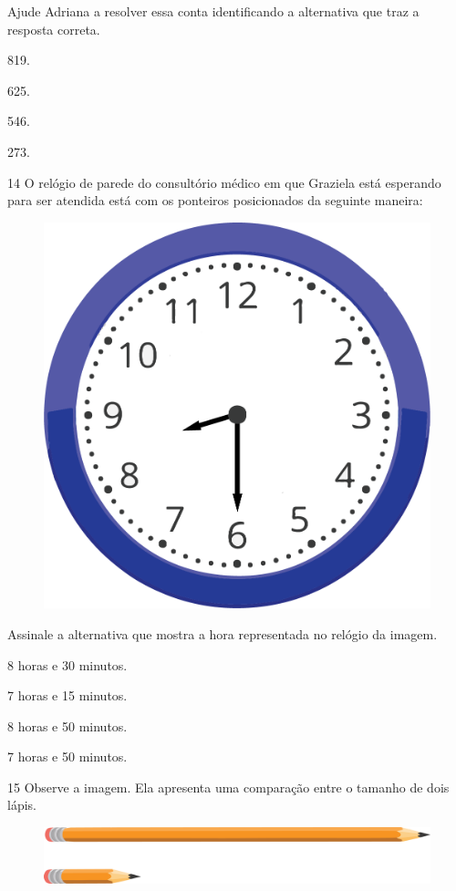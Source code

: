 Ajude Adriana a resolver essa conta identificando a alternativa que traz a resposta correta.

\begin{multicols}{2}
\begin{escolha}
\item
  819.
\item
  625.
\item
  546.
\item
  273.
\end{escolha}
\end{multicols}


\num{14} O relógio de parede do consultório médico em que Graziela está esperando
para ser atendida está com os ponteiros posicionados da seguinte maneira:

\begin{figure}[htpb!]
\centering
\includegraphics[width=.5\textwidth]{./media/image100.png}
\end{figure}

Assinale a alternativa que mostra a hora representada no relógio da imagem.

\begin{escolha}
\item
  8 horas e 30 minutos.
\item
  7 horas e 15 minutos.
\item
  8 horas e 50 minutos.
\item
  7 horas e 50 minutos.
\end{escolha}


\num{15} Observe a imagem. Ela apresenta uma comparação entre o tamanho de dois lápis.

\begin{figure}[htpb!]
\centering
\includegraphics[width=\textwidth]{./media/image101.png}
\end{figure}

